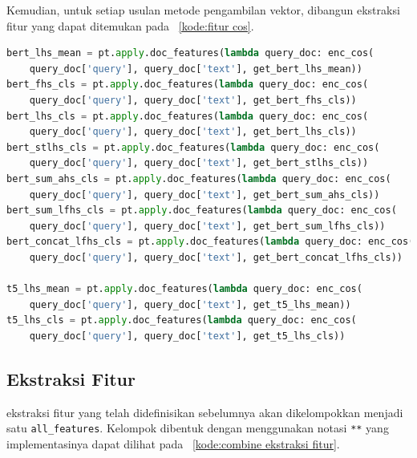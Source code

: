 Kemudian, untuk setiap usulan metode pengambilan vektor, dibangun \pipeline{} ekstraksi fitur yang dapat ditemukan pada \kode{}~\ref{kode:fitur cos}.
\begin{lstlisting}[language=Python, caption={\Pipeline{} ekstraksi fitur \textit{cosine\_similarity} dari \encoder{}}, label={kode:fitur cos}]
bert_lhs_mean = pt.apply.doc_features(lambda query_doc: enc_cos(
    query_doc['query'], query_doc['text'], get_bert_lhs_mean))
bert_fhs_cls = pt.apply.doc_features(lambda query_doc: enc_cos(
    query_doc['query'], query_doc['text'], get_bert_fhs_cls))
bert_lhs_cls = pt.apply.doc_features(lambda query_doc: enc_cos(
    query_doc['query'], query_doc['text'], get_bert_lhs_cls))
bert_stlhs_cls = pt.apply.doc_features(lambda query_doc: enc_cos(
    query_doc['query'], query_doc['text'], get_bert_stlhs_cls))
bert_sum_ahs_cls = pt.apply.doc_features(lambda query_doc: enc_cos(
    query_doc['query'], query_doc['text'], get_bert_sum_ahs_cls))
bert_sum_lfhs_cls = pt.apply.doc_features(lambda query_doc: enc_cos(
    query_doc['query'], query_doc['text'], get_bert_sum_lfhs_cls))
bert_concat_lfhs_cls = pt.apply.doc_features(lambda query_doc: enc_cos(
    query_doc['query'], query_doc['text'], get_bert_concat_lfhs_cls))

t5_lhs_mean = pt.apply.doc_features(lambda query_doc: enc_cos(
    query_doc['query'], query_doc['text'], get_t5_lhs_mean))
t5_lhs_cls = pt.apply.doc_features(lambda query_doc: enc_cos(
    query_doc['query'], query_doc['text'], get_t5_lhs_cls))
\end{lstlisting}


\subsection{\Pipeline{} Ekstraksi Fitur}
\label{subbab:4:Ekstraksi Fitur:Pipeline Ekstraksi Fitur}
\Pipeline{} ekstraksi fitur yang telah didefinisikan sebelumnya akan dikelompokkan menjadi satu \pipeline{} \lstinline{all_features}. Kelompok \pipeline{} dibentuk dengan menggunakan notasi \lstinline{**} yang implementasinya dapat dilihat pada \kode{}~\ref{kode:combine ekstraksi fitur}.

